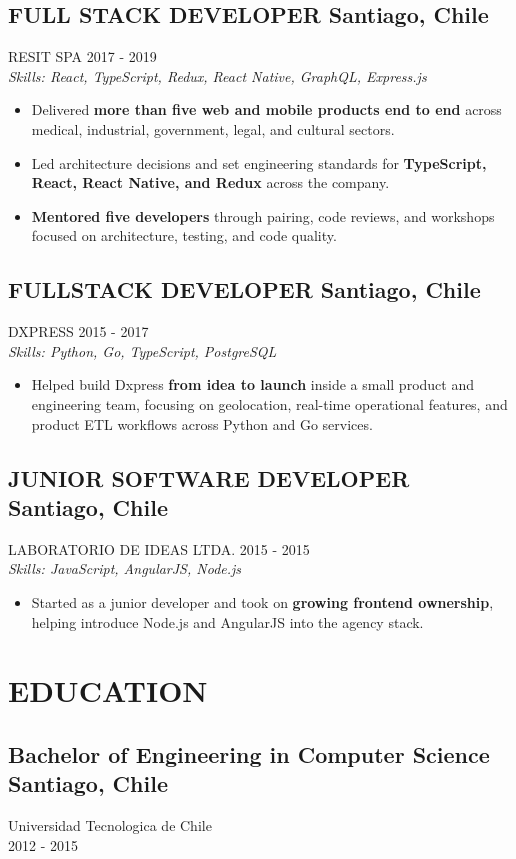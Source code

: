\documentclass{article}
\newcommand{\SubHeading}[1]{
   \subsection*{#1}\vspace{-0.5em}
}
\newcommand{\WorkExperience}[2]{
   \subsection*{#1}
   \vspace{-1em}
   \uppercase{#2}
}
\newcommand{\Skills}[1]{
   \textit{Skills: #1}
}
\begin{document}
\WorkExperience{FULL STACK DEVELOPER \hfill Santiago, Chile}{Resit SPA \hfill 2017 {-} 2019} \\
\Skills{React, TypeScript, Redux, React Native, GraphQL, Express.js}
\begin{itemize}
	\item Delivered \textbf{more than five web and mobile products end to end} across medical, industrial, government, legal, and cultural sectors.
	\item Led architecture decisions and set engineering standards for \textbf{TypeScript, React, React Native, and Redux} across the company.
	\item \textbf{Mentored five developers} through pairing, code reviews, and workshops focused on architecture, testing, and code quality.
\end{itemize}

\WorkExperience{FULLSTACK DEVELOPER \hfill Santiago, Chile}{Dxpress \hfill 2015 {-} 2017} \\
\Skills{Python, Go, TypeScript, PostgreSQL}
\begin{itemize}
	\item Helped build Dxpress \textbf{from idea to launch} inside a small product and engineering team, focusing on geolocation, real-time operational features, and product ETL workflows across Python and Go services.
\end{itemize}

\WorkExperience{JUNIOR SOFTWARE DEVELOPER \hfill Santiago, Chile}{Laboratorio de Ideas Ltda. \hfill 2015 {-} 2015} \\
\Skills{JavaScript, AngularJS, Node.js}
\begin{itemize}
	\item Started as a junior developer and took on \textbf{growing frontend ownership}, helping introduce Node.js and AngularJS into the agency stack.
\end{itemize}

\section*{EDUCATION}
\SubHeading{Bachelor of Engineering in Computer Science \hfill Santiago, Chile}
Universidad Tecnologica de Chile \\[0.1em]
2012 {-} 2015
\end{document}
